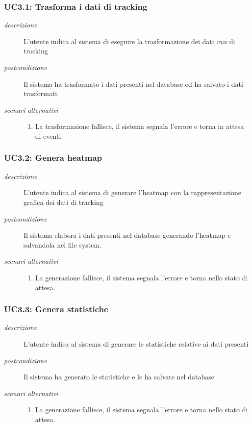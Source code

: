 \subsubsection{UC3.1: Trasforma i dati di tracking} \label{sec:UC3.1}
\begin{description}
\item[\em{descrizione }]L'utente indica al sistema di eseguire la trasformazione dei dati \textit{raw} di tracking
\item[\em{postcondizione }] Il sistema ha trasformato i dati presenti nel database ed ha salvato i dati trasformati.
\item[\em{scenari alternativi }] \mbox{} 
\begin{enumerate} 
\item La trasformazione fallisce, il sistema segnala l'errore e torna in attesa di eventi
\end{enumerate}
\end{description}

\subsubsection{UC3.2: Genera heatmap} \label{sec:UC3.2}
\begin{description}
\item[\em{descrizione }]L'utente indica al sistema di generare l'heatmap con la rappresentazione grafica dei dati di tracking
\item[\em{postcondizione }] Il sistema elabora i dati presenti nel database generando l'heatmap e salvandola nel file system.
\item[\em{scenari alternativi }] \mbox{} 
\begin{enumerate} 
\item La generazione fallisce, il sistema segnala l'errore e torna nello stato di attesa.
\end{enumerate}
\end{description}

\subsubsection{UC3.3: Genera statistiche} \label{sec:UC3.3}
\begin{description}
\item[\em{descrizione }]L'utente indica al sistema di generare le statistiche relative ai dati presenti
\item[\em{postcondizione }] Il sistema ha generato le statistiche e le ha salvate nel database
\item[\em{scenari alternativi }] \mbox{} 
\begin{enumerate} 
\item La generazione fallisce, il sistema segnala l'errore e torna nello stato di attesa.
\end{enumerate}
\end{description}
